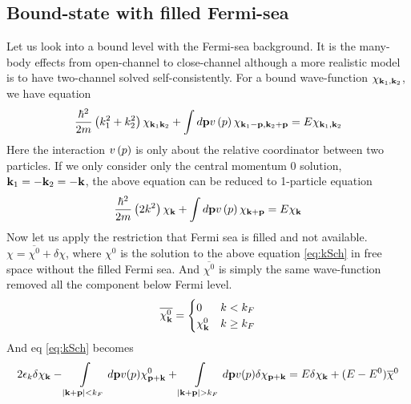 \subsection{Bound-state with filled Fermi-sea\label{subsec:oneMolInFermiSea}}
Let us look into a bound level with the Fermi-sea background.  It  is the many-body effects from open-channel to close-channel although a more realistic model is to have two-channel solved self-consistently.  For a bound wave-function $\chi_{\mathbf{k}_1,\mathbf{k}_2}$, we have equation 
\begin{equation}
\frac{\hbar^2}{2m}\left(k_1^2+k_2^2\right)\chi_{\mathbf{k}_1\mathbf{k}_2}+\int{}d\mathbf{p}{}v\left(p\right)\chi_{\mathbf{k}_1-\mathbf{p},\mathbf{k}_2+\mathbf{p}}=E\chi_{\mathbf{k}_1,\mathbf{k}_2}
\end{equation}
Here the interaction $v\left(p\right)$ is only about the relative coordinator between two particles.  If we only consider only the central momentum 0 solution, $\mathbf{k}_1=-\mathbf{k}_2=-\mathbf{k}$, the above equation can be reduced to 1-particle equation
\begin{equation}\label{eq:kSch}
\frac{\hbar^2}{2m}\left(2k^2\right)\chi_{\mathbf{k}}+\int{}d\mathbf{p}{}v\left(p\right)\chi_{\mathbf{k}+\mathbf{p}}=E\chi_{\mathbf{k}}
\end{equation}
Now let us apply the restriction that Fermi sea is filled and not available.  $\chi=\overline{\chi^0}+\delta\chi$, where $\chi^0$ is the solution to the above equation \eqref{eq:kSch} in free space without the filled Fermi sea.  And $\overline{\chi^0}$ is simply the same wave-function removed all the component below Fermi level. 
\begin{equation}
\overline{\chi^0_{\mathbf{k}}}=\begin{cases}0&k<k_F\\\chi^0_{\mathbf{k}}&k\geq{}k_F\end{cases}
\end{equation}
And eq \eqref{eq:kSch} becomes 
\begin{equation}\label{eq:chiPerturb}
2\epsilon_k\delta\chi_{\mathbf{k}}-\int\limits_{\lvert{\ensuremath{\mathbf{k}}+\ensuremath{\mathbf{p}}}\rvert<k_F}d\mathbf{p}{}v(p)\chi^0_{\mathbf{p}+\mathbf{k}}+\int\limits_{\lvert{\ensuremath{\mathbf{k}}+\ensuremath{\mathbf{p}}}\rvert>k_F}d\mathbf{p}{}v(p)\delta\chi_{\mathbf{p}+\mathbf{k}}=E\delta\chi_{\mathbf{k}}+(E-E^0)\overline\chi^0
\end{equation}

